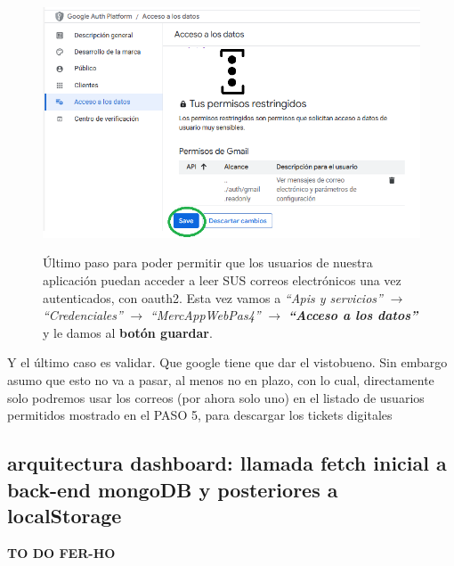 \documentclass[a4paper,12pt]{report}
\begin{document}
		
		\FloatBarrier
		\setlength{\belowcaptionskip}{3pt}
		\begin{figure}[H]
			\centering
			\caption{Último paso para poder permitir que los usuarios de nuestra aplicación puedan acceder a leer SUS correos electrónicos una vez autenticados, con oauth2. Esta vez vamos a \textit{``Apis y servicios''} $\rightarrow$ \textit{``Credenciales''} $\rightarrow$ \textit{``MercAppWebPas4''} $\rightarrow$ \textbf{\textit{``Acceso a los datos''}} y le damos al \textbf{botón guardar}. }
			\includegraphics[width=1\linewidth]{img/googleCloudH}
			\label{fig:googleCloudH}
		\end{figure}
		\FloatBarrier
	
		Y el último caso es validar. Que google tiene que dar el vistobueno. Sin embargo asumo que esto no va a pasar, al menos no en plazo, con lo cual, directamente solo podremos usar los correos (por ahora solo uno) en el listado de usuarios permitidos mostrado en el PASO 5, para descargar los tickets digitales 
		
		
		
		
		
		
	\subsection{arquitectura dashboard: llamada fetch inicial a back-end mongoDB y posteriores a localStorage}
	\label{sec:dashboardFetchLocalStorage}
	\textbf{TO DO FER-HO}
	
\end{document}
